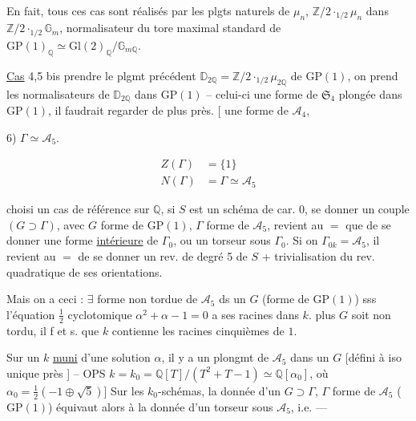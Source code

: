  En fait, tous ces cas sont réalisés par
les plgts naturels de $\mu_n$, $\mathbb Z/2\mathbin{\cdot_{1/2}}\mu_n$ dans
$\mathbb Z/2\mathbin{\cdot_{1/2}}\mathbb G_m$, normalisateur du tore maximal
standard de $\mathrm{GP}(1)_{\mathbb Q}\simeq\mathrm{Gl}(2)_{\mathbb Q}/\mathbb G_{m\mathbb Q}$.

\uline{Cas} 4,5 bis  prendre le plgmt précédent
$\mathbb D_{2\mathbb Q}=\mathbb Z/2\mathbin{\cdot_{1/2}}\mu_{2\mathbb Q}$ de $\mathrm{GP}(1)$, on prend
les normalisateurs  de $\mathbb D_{2\mathbb Q}$ dans $\mathrm{GP}(1)$ --
celui-ci  une forme  de $\mathfrak S_4$ plongée dans $\mathrm{GP}(1)$,
il faudrait regarder de plus près. [
 une forme de $\mathcal A_4$,

6) $\Gamma\simeq\mathcal A_5$.

\[
\begin{aligned}
Z(\Gamma)&=\{1\}\\ 
N(\Gamma)&=\Gamma\simeq\mathcal A_5
\end{aligned}
\]

 choisi un cas de référence  sur $\mathbb Q$, si $S$ est
un schéma de car. 0, se donner un couple
$(G\supset\Gamma)$, avec $G$ forme de $\mathrm{GP}(1)$, $\Gamma$ forme de $\mathcal A_5$,
revient au $=$ que de se donner une forme
\uline{intérieure} de $\Gamma_0$, ou un torseur sous $\Gamma_0$.
Si on   $\Gamma_{0k}=\mathcal A_5$, il revient au $=$ de se donner
 un rev. de degré 5 de $S$ + trivialisation
du rev. quadratique de ses orientations.

Mais on a ceci : $\exists$  forme non tordue de $\mathcal A_5$ ds un
$G$ (forme de $\mathrm{GP}(1)$) sss l'équation $\frac12$ cyclotomique
$\alpha^2+\alpha-1=0$ a ses racines dans $k$. 
  plus $G$ soit non tordu, il f et s. que
$k$ contienne les racines cinquièmes de $1$.


Sur un $k$ \uline{muni} d'une solution $\alpha$, il y a un
plongmt de $\mathcal A_5$ dans un $G$ [défini à iso unique
près ]
-- OPS $k=k_0=\mathbb Q[T]/(T^2+T-1)\simeq\mathbb Q[\alpha_0]$, où
$\alpha_0=\frac12(-1\mathbin{\oplus}\sqrt5)$] Sur les $k_0$-schémas, la donnée
d'un $G\supset\Gamma$, $\Gamma$  forme de $\mathcal A_5$ ($\mathrm{GP}(1)$) équivaut
alors à la donnée d'un torseur sous $\mathcal A_5$,
i.e. ---

